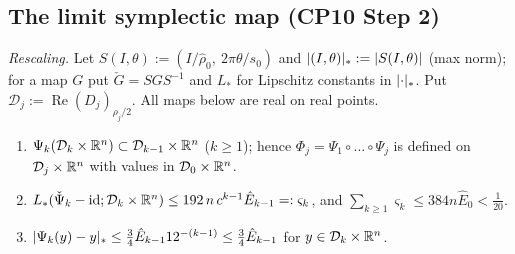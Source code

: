 \subsection{The limit symplectic map (CP10 Step 2)}\label{bpP:p3:limitmap}

\emph{Rescaling.} Let $S(I,\theta):=(I/\hat\rho_0,\ 2\pi\theta/s_0)$ and $\lvert (I,\theta)\rvert_*:=\lvert S(I,\theta)\rvert$ (max norm); for a map $G$ put $\check G=SGS^{-1}$ and $L_*$ for Lipschitz constants in $\lvert \cdot\rvert_*$. Put $\mathcal D_j:=\operatorname{Re}(D_j)_{\rho_j/2}$. All maps below are real on real points.

\begin{lemma}\label{bpP:p3:psi-lip}
\begin{enumerate}[label=(\roman*)]
\item $\Psi_k(\mathcal D_k\times\mathbb{R}^n)\subset\mathcal D_{k-1}\times\mathbb{R}^n$ ($k\ge1$); hence $\Phi_j=\Psi_1\circ\dots\circ\Psi_j$ is defined on $\mathcal D_j\times\mathbb{R}^n$ with values in $\mathcal D_0\times\mathbb{R}^n$.
\item $L_*(\check\Psi_k-\mathrm{id};\mathcal D_k\times\mathbb{R}^n)\le192\,n\,c^{k-1}\hat E_{k-1}=:\varsigma_k$, and $\sum_{k\ge1}\varsigma_k\le384n\hat E_0<\frac1{20}$.
\item $\lvert \Psi_k(y)-y\rvert_*\le\frac34\hat E_{k-1}12^{-(k-1)}\le\frac34\hat E_{k-1}$ for $y\in\mathcal D_k\times\mathbb{R}^n$.
\end{enumerate}
\end{lemma}
